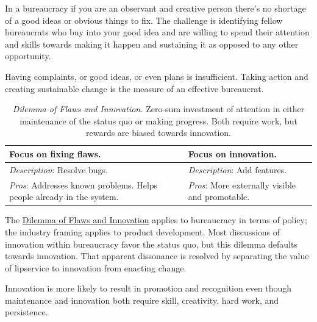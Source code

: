 In a bureaucracy if you are an observant and creative person there's no shortage of a good ideas or obvious things to fix.
The challenge is identifying fellow bureaucrats who buy into your good idea and are willing to spend their attention and skills towards making it happen and sustaining it as opposed to any other opportunity.

Having complaints, or good ideas, or even plans is insufficient. Taking action and creating sustainable change is the measure of an effective bureaucrat.



\begin{center}
\begin{table}[H] %
\begin{tabular}{ | m{\dilemmatablewidth}| m{\dilemmatablewidth} | } 
  \hline
  \textbf{Focus on fixing flaws.} &
  \textbf{Focus on innovation.} \\
  \hline
  \textit{Description}: Resolve bugs. &
  \textit{Description}: Add features. \\
  \hline
  \textit{Pros}: Addresses known problems. Helps people already in the system.  & 
  \textit{Pros}: More externally visible and promotable. \\
  \hline
\end{tabular}
\caption{
\textit{Dilemma of Flaws and Innovation.}
Zero-sum investment of attention in either maintenance of the status quo or making progress. Both require work, but rewards are biased towards innovation. 
}
\label{table:flaws-and-innovation}
\end{table}
\end{center}

The \hyperref[table:flaws-and-innovation]{Dilemma of Flaws and Innovation} applies to bureaucracy in terms of policy; the industry framing applies to product development. Most discussions of innovation within bureaucracy favor the status quo, but this dilemma defaults towards innovation. That apparent dissonance is resolved by separating the value of lipservice to innovation from enacting change.

Innovation is more likely to result in promotion and recognition even though maintenance and innovation both require skill, creativity, hard work, and persistence. 

